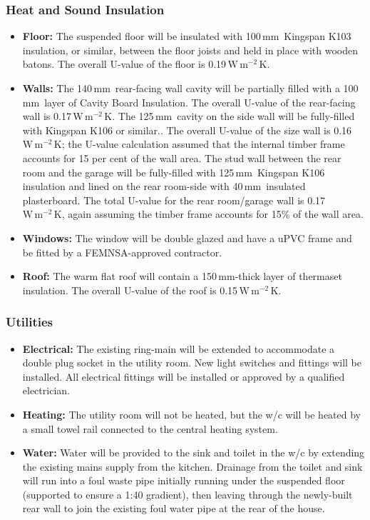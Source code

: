 \documentclass{extension}
\newcommand{\mm}{\,$\mathrm{mm}$}
\newcommand{\uunit}{\,$\mathrm{W\,m^{-2}\,K}$}
\begin{document}
\subsubsection{Heat and Sound Insulation}
\begin{itemize}
  \item {\bf Floor:} The suspended floor will be insulated with 100\mm\ Kingspan K103 insulation, or similar, between the floor joists and held in place with wooden batons. The overall U-value of the floor is 0.19\uunit .
  \item {\bf Walls:} The 140\mm\ rear-facing wall cavity will be partially filled with a 100\mm\ layer of Cavity Board Insulation.\cite{uw1ins} The overall U-value of the rear-facing wall is 0.17\uunit . The 125\mm\ cavity on the side wall will be fully-filled with Kingspan K106 or similar.\cite{uw2ins}. The overall U-value of the size wall is 0.16\uunit ; the U-value calculation assumed that the internal timber frame accounts for 15 per cent of the wall area. The stud wall between the rear room and the garage will be fully-filled with 125\mm\ Kingspan K106\cite{uw2ins} insulation and lined on the rear room-side with 40\mm\ insulated plasterboard.\cite{uw3ins} The total U-value for the rear room/garage wall is 0.17\uunit , again assuming the timber frame accounts for 15\% of the wall area.
  \item {\bf Windows:} The window will be double glazed and have a uPVC frame and be fitted by a FEMNSA-approved contractor.
  \item {\bf Roof:} The warm flat roof will contain a 150\mm -thick layer of thermaset insulation.\cite{erins} The overall U-value of the roof is 0.15\uunit .
\end{itemize}

\subsubsection{Utilities}
\begin{itemize}
  \item {\bf Electrical:} The existing ring-main will be extended to accommodate a double plug socket in the utility room. New light switches and fittings will be installed. All electrical fittings will be installed or approved by a qualified electrician.
  \item {\bf Heating:} The utility room will not be heated, but the w/c will be heated by a small towel rail connected to the central heating system.
  \item {\bf Water:} Water will be provided to the sink and toilet in the w/c by extending the existing mains supply from the kitchen. Drainage from the toilet and sink will run into a foul waste pipe initially running under the suspended floor (supported to ensure a 1:40 gradient), then leaving through the newly-built rear wall to join the existing foul water pipe at the rear of the house.
\end{itemize}
\end{document}
